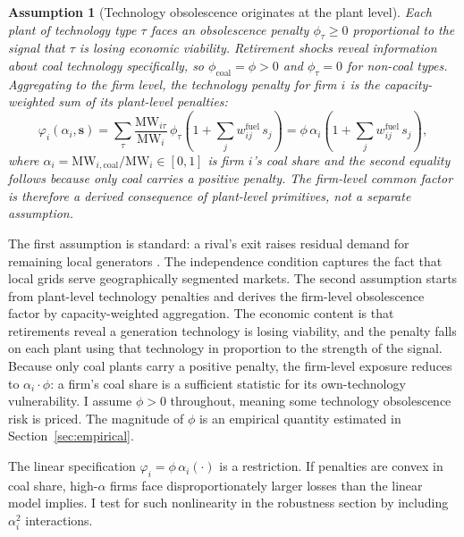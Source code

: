 \documentclass[12pt,a4paper]{article}
\newtheorem{assumption}{Assumption}
\begin{document}
\begin{assumption}[Technology obsolescence originates at the plant level]\label{ass:obsolescence}
    Each plant of technology type $\tau$ faces an obsolescence penalty $\phi_\tau \geq 0$ proportional to the signal that $\tau$ is losing economic viability. Retirement shocks reveal information about coal technology specifically, so $\phi_{\mathrm{coal}} = \phi > 0$ and $\phi_\tau = 0$ for non-coal types. Aggregating to the firm level, the technology penalty for firm $i$ is the capacity-weighted sum of its plant-level penalties:
    \begin{equation}\label{eq:obsolescence}
        \varphi_i(\alpha_i, \mathbf{s}) = \sum_\tau \frac{\mathrm{MW}_{i\tau}}{\mathrm{MW}_i}\,\phi_\tau \left(1 + \sum_{j} w^{\mathrm{fuel}}_{ij}\, s_j\right) = \phi\,\alpha_i\!\left(1 + \sum_{j} w^{\mathrm{fuel}}_{ij}\, s_j\right),
    \end{equation}
    where $\alpha_i = \mathrm{MW}_{i,\mathrm{coal}} / \mathrm{MW}_i \in [0,1]$ is firm $i$'s coal share and the second equality follows because only coal carries a positive penalty. The firm-level common factor is therefore a derived consequence of plant-level primitives, not a separate assumption.
\end{assumption}

The first assumption is standard: a rival's exit raises residual demand for remaining local generators \citep{DavisHausman2016}. The independence condition captures the fact that local grids serve geographically segmented markets. The second assumption starts from plant-level technology penalties and derives the firm-level obsolescence factor by capacity-weighted aggregation. The economic content is that retirements reveal a generation technology is losing viability, and the penalty falls on each plant using that technology in proportion to the strength of the signal. Because only coal plants carry a positive penalty, the firm-level exposure reduces to $\alpha_i \cdot \phi$: a firm's coal share is a sufficient statistic for its own-technology vulnerability. I assume $\phi > 0$ throughout, meaning some technology obsolescence risk is priced. The magnitude of $\phi$ is an empirical quantity estimated in Section~\ref{sec:empirical}.

The linear specification $\varphi_i = \phi\,\alpha_i(\cdot)$ is a restriction. If penalties are convex in coal share, high-$\alpha$ firms face disproportionately larger losses than the linear model implies. I test for such nonlinearity in the robustness section by including $\alpha_i^2$ interactions.
\end{document}
